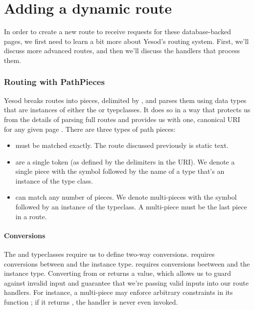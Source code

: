 \section{Adding a dynamic route}

In order to create a new route to receive requests for these database-backed pages, we first need to learn a bit more about Yesod's routing system. First, we'll discuss more advanced routes, and then we'll discuss the handlers that process them.

\subsubsection{Routing with PathPieces}

Yesod breaks routes into pieces, delimited by \code{/}, and parses them using data types that are instances of either the  or  tyepclasses. It does so in a way that protects us from the details of parsing full routes and provides us with one, canonical URI for any given page \cite{ybkRouting}. There are three types of path pieces:

\begin{itemize}
  \item {} must be matched exactly. The  route discussed previously is static text.
  \item {} are a single token (as defined by the \code{/} delimiters in the URI). We denote a single piece with the \code{\#} symbol followed by the name of a type that's an instance of the  type class.
  \item {} can match any number of pieces. We denote multi-pieces with the \code{*} symbol followed by an instance of the  typeclass. A multi-piece must be the last piece in a route.
\end{itemize}

\paragraph{Conversions} The  and  typeclasses require us to define two-way conversions.  requires conversions between  and the instance type.  requires conversions beetween \code{[Text]} and the instance type. Converting from  or \code{[Text]} returns a  value, which allows us to guard against invalid input and guarantee that we're passing valid inputs into our route handlers. For instance, a multi-piece may enforce arbitrary constraints in its function ; if it returns , the handler is never even invoked.


